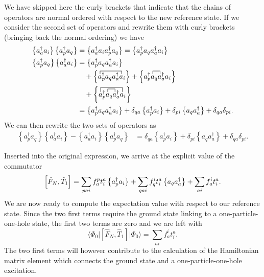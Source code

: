 We have skipped here the curly brackets that indicate that the chains of operators are normal ordered with respect to the new reference state. 
If we consider the second set of operators and rewrite them with curly brackets (bringing back the normal ordering) we have
        \begin{align*}
            \left\{a_a^\dagger a_i\right\} \left\{a_p^\dagger a_q \right\} &= \normord{a_a^\dagger a_i a_p^\dagger a_q}
                = \normord{a_p^\dagger a_q a_a^\dagger a_i} \\ 
        \normord{a_p^\dagger a_q}\normord{a_a^\dagger a_i} &= \normord{a_p^\dagger a_q a_a^\dagger a_i}  \\
            & \quad + \normord{
               \contraction{}{a}{{}^\dagger_pa_q a^\dagger_a}{a}
                a^\dagger_p a_q a^\dagger_a a_i} +
            \normord{
                \contraction{a^\dagger_p}{a}{{}_q}{a}
                a^\dagger_p a_q a^\dagger_a a_i} \\ 
            & \quad + \normord{
                \contraction[1.5ex]{}{a}{{}^\dagger_pa_q a^\dagger_a}{a}
                \contraction{a^\dagger_p}{a}{{}_q}{a}
                a^\dagger_p a_q a^\dagger_a a_i} \\ 
            &=  \normord{a_p^\dagger a_q a_a^\dagger a_i} + \delta_{qa} \normord{a_p^\dagger a_i} + \delta_{pi} \normord{a_q a_a^\dagger}
            + \delta_{qa}\delta_{pi}.
        \end{align*}
We can then rewrite the two sets of operators as
        \begin{align*}
            \left\{a_p^\dagger a_q \right\}\left\{a_a^\dagger a_i\right\} - \left\{a_a^\dagger a_i\right\} \left\{a_p^\dagger a_q \right\} &= \delta_{qa} \left\{ a_p^\dagger a_i\right\} + \delta_{pi} \left\{ a_q a_a^\dagger \right\} + \delta_{qa}\delta_{pi}.
    \end{align*}

        Inserted into the original expression, we arrive at the explicit value of the commutator
        \[
        \left[ \hat{F}_N, \hat{T}_1 \right] = \sum_{pai} f_a^p t_i^a \left\{a_p^\dagger a_i\right\} + 
                \sum_{qai} f_q^i t_i^a \left\{a_q a_a^\dagger\right\} + \sum_{ai} f_a^i t_i^a.
        \]
We are now ready to compute the expectation value with respect to our reference state. Since the two first terms require the ground state linking to 
a one-particle-one-hole state, the first two terms are zero and we are left with 
\begin{equation}\label{eq:firsttermE}
\langle \Phi_0 \vert \left[ \hat{F}_N, \hat{T}_1 \right] \vert \Phi_0\rangle = \sum_{ai} f_a^i t_i^a.
\end{equation}
The two first terms will however contribute to the calculation of the Hamiltonian  matrix element which connects the ground state and a one-particle-one-hole excitation. 
  
